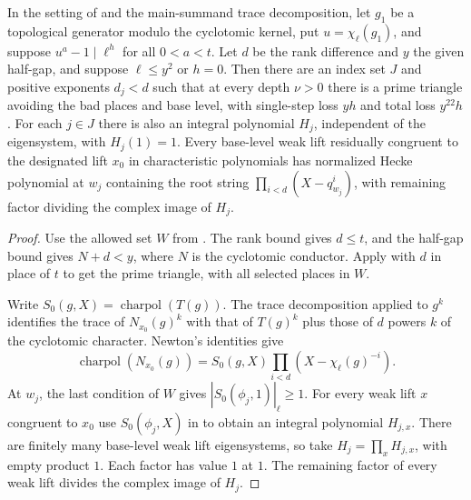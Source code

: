 \begin{lemma}
\label{lem:c-hecke-root-chain-triangle}
\emitthmsource
In the setting of  and the main-summand trace decomposition, let $g_1$ be a topological generator modulo the cyclotomic kernel, put $u=\chi_\ell(g_1)$, and suppose $u^a-1\mid\ell^h$ for all $0<a<t$. Let $d$ be the rank difference and $y$ the given half-gap, and suppose $\ell\le y^2$ or $h=0$. Then there are an index set $J$ and positive exponents $d_j<d$ such that at every depth $\nu>0$ there is a prime triangle avoiding the bad places and base level, with single-step loss $yh$ and total loss $y^{22}h$. For each $j\in J$ there is also an integral polynomial $H_j$, independent of the eigensystem, with $H_j(1)=1$. Every base-level weak lift residually congruent to the designated lift $x_0$ in characteristic polynomials has normalized Hecke polynomial at $w_j$ containing the root string $\prod_{i<d}(X-q_{w_j}^i)$, with remaining factor dividing the complex image of $H_j$.
\end{lemma}
\begin{proof}
Use the allowed set $W$ from . The rank bound gives $d\le t$, and the half-gap bound gives $N+d<y$, where $N$ is the cyclotomic conductor. Apply  with $d$ in place of $t$ to get the prime triangle, with all selected places in $W$.

Write $S_0(g,X)=\operatorname{charpol}(T(g))$. The trace decomposition applied to $g^k$ identifies the trace of $N_{x_0}(g)^k$ with that of $T(g)^k$ plus those of $d$ powers $k$ of the cyclotomic character. Newton's identities give
\[
 \operatorname{charpol}(N_{x_0}(g))=S_0(g,X)\prod_{i<d}(X-\chi_\ell(g)^{-i}).
\]
At $w_j$, the last condition of $W$ gives $|S_0(\phi_j,1)|_\ell\ge1$. For every weak lift $x$ congruent to $x_0$ use $S_0(\phi_j,X)$ in  to obtain an integral polynomial $H_{j,x}$. There are finitely many base-level weak lift eigensystems, so take $H_j=\prod_x H_{j,x}$, with empty product $1$. Each factor has value $1$ at $1$. The remaining factor of every weak lift divides the complex image of $H_j$.
\end{proof}

